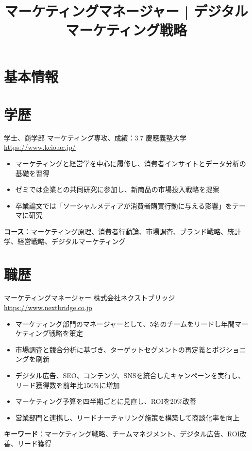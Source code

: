 \documentclass[a4paper, serif, 10pt]{moderncv}
\title{マーケティングマネージャー | デジタルマーケティング戦略}
\begin{document}
\maketitle

\section{基本情報}

\section{学歴}

        {学士、商学部 マーケティング専攻、成績：3.7}
        {慶應義塾大学}
        {\url{https://www.keio.ac.jp/}}
        {}
        {\begin{itemize}
\item マーケティングと経営学を中心に履修し、消費者インサイトとデータ分析の基礎を習得
\item ゼミでは企業との共同研究に参加し、新商品の市場投入戦略を提案
\item 卒業論文では「ソーシャルメディアが消費者購買行動に与える影響」をテーマに研究
\end{itemize}
\textbf{コース}：マーケティング原理、消費者行動論、市場調査、ブランド戦略、統計学、経営戦略、デジタルマーケティング}
\section{職歴}

        {マーケティングマネージャー}
        {株式会社ネクストブリッジ}
        {\url{https://www.nextbridge.co.jp}}
        {}
        {\begin{itemize}
\item マーケティング部門のマネージャーとして、5名のチームをリードし年間マーケティング戦略を策定
\item 市場調査と競合分析に基づき、ターゲットセグメントの再定義とポジショニングを刷新
\item デジタル広告、SEO、コンテンツ、SNSを統合したキャンペーンを実行し、リード獲得数を前年比150\%に増加
\item マーケティング予算を四半期ごとに見直し、ROIを20\%改善
\item 営業部門と連携し、リードナーチャリング施策を構築して商談化率を向上
\end{itemize}
\textbf{キーワード}：マーケティング戦略、チームマネジメント、デジタル広告、ROI改善、リード獲得}
\end{document}
